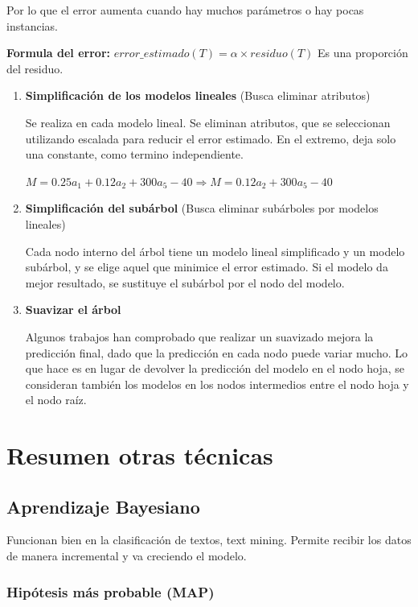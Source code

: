\documentclass[12pt]{report} %
\begin{document}
Por lo que el error aumenta cuando hay muchos parámetros o hay pocas
instancias.

\textbf{Formula del error:}
\(error\_estimado(T) = \alpha \times residuo(T)\) Es una proporción del
residuo.

\begin{enumerate}
\def\labelenumi{\arabic{enumi}.}
\item
  \textbf{Simplificación de los modelos lineales} (Busca eliminar
  atributos)

  Se realiza en cada modelo lineal. Se eliminan atributos, que se
  seleccionan utilizando escalada para reducir el error estimado. En el
  extremo, deja solo una constante, como termino independiente.

  \(M= 0.25a_1+0.12a_2+300a_5-40 \Rightarrow M=0.12a_2+300a_5-40\)
\item
\textbf{Simplificación del subárbol} (Busca eliminar subárboles por modelos
  lineales)

  Cada nodo interno del árbol tiene un modelo lineal simplificado y un
  modelo subárbol, y se elige aquel que minimice el error estimado. Si
  el modelo da mejor resultado, se sustituye el subárbol por el nodo del
  modelo.
\item
  \textbf{Suavizar el árbol}

  Algunos trabajos han comprobado que realizar un suavizado mejora la
  predicción final, dado que la predicción en cada nodo puede variar
  mucho. Lo que hace es en lugar de devolver la predicción del modelo en
  el nodo hoja, se consideran también los modelos en los nodos
  intermedios entre el nodo hoja y el nodo raíz.
\end{enumerate}

\chapter{Resumen otras técnicas}

\section{Aprendizaje Bayesiano}

Funcionan bien en la clasificación de textos, text mining. Permite
recibir los datos de manera incremental y va creciendo el modelo.

\subsection{Hipótesis más probable
(MAP)}
\end{document}
